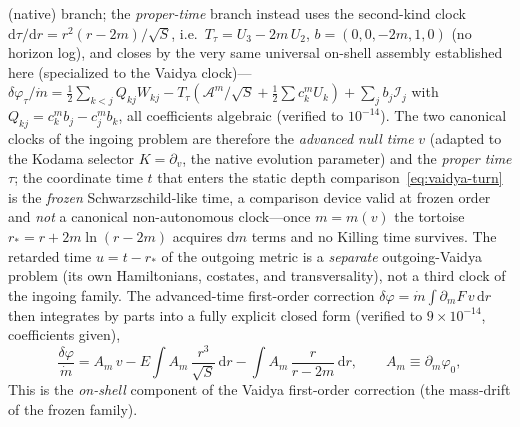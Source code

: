 \documentclass[12pt]{iopart}
\newcommand{\dd}{\mathrm{d}}
\theoremstyle{plain}
\theoremstyle{definition}
\theoremstyle{plain}
\theoremstyle{remark}
\begin{document}
(native) branch; the \emph{proper-time} branch instead uses the second-kind clock
$\dd\tau/\dd r=r^2(r-2m)/\sqrt S$, i.e.\ $T_\tau=U_3-2m\,U_2$, $b=(0,0,-2m,1,0)$ (no
horizon log), and closes by the very same
universal on-shell assembly established here (specialized to the Vaidya clock)---$\delta\varphi_\tau/\dot m=\tfrac12\sum_{k<j}Q_{kj}
W_{kj}-T_\tau(\mathcal{A}^m/\sqrt S+\tfrac12\sum c_k^m U_k)+\sum_j b_j\mathcal{I}_j$ with
$Q_{kj}=c_k^m b_j-c_j^m b_k$, all coefficients algebraic (verified to
$10^{-14}$). The two canonical clocks of the ingoing problem are therefore the
\emph{advanced null time} $v$ (adapted to the Kodama selector $K=\partial_v$, the
native evolution parameter) and the \emph{proper time} $\tau$; the coordinate time
$t$ that enters the static depth comparison~\eqref{eq:vaidya-turn} is the
\emph{frozen} Schwarzschild-like time, a comparison device valid at frozen order and
\emph{not} a canonical non-autonomous clock---once $m=m(v)$ the tortoise
$r_*=r+2m\ln(r-2m)$ acquires $\dd m$ terms and no Killing time survives. The retarded
time $u=t-r_*$ of the outgoing metric is a \emph{separate} outgoing-Vaidya problem
(its own Hamiltonians, costates, and transversality), not a third clock of the ingoing
family. The advanced-time first-order correction
$\delta\varphi=\dot m\!\int\!\partial_m F\,v\,\dd r$ then integrates by parts into a
fully explicit closed form (verified to $9\times10^{-14}$, coefficients given),
\begin{equation}
    \frac{\delta\varphi}{\dot m}
    =A_m\,v-E\!\int\! A_m\,\frac{r^3}{\sqrt S}\,\dd r
    -\int\! A_m\,\frac{r}{r-2m}\,\dd r,\qquad A_m\equiv\partial_m\varphi_0,
    \label{eq:vaidya-deltaphi}
\end{equation}
This is the \emph{on-shell} component of the Vaidya first-order correction (the
mass-drift of the frozen family).
\end{document}
